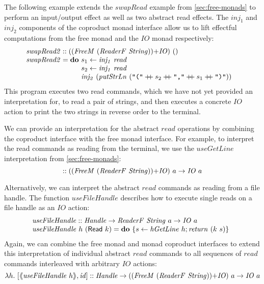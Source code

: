 \documentclass{jfp1}
\newcommand{\fmext}[1]{\langle\kern-0.25em\langle #1 \rangle\kern-0.25em\rangle}
\newcommand{\kw}[1]{\textbf{#1}}
\begin{document}
The following example extends the $\mathit{swapRead}$ example from
\autoref{sec:free-monads} to perform an input/output effect as well as
two abstract read effects.  The $\mathit{inj_1}$ and $\mathit{inj_2}$
components of the coproduct monad interface allow us to lift effectful
computations from the free monad and the $\mathit{IO}$ monad respectively:
\begin{displaymath}
  \begin{array}{@{}l}
    \mathit{swapRead2} :: (\cprd{(\mathit{FreeM}~(\mathit{ReaderF}~\mathit{String}))}{\mathit{IO}})~() \\
    \mathit{swapRead2} = \kw{do}~
    \begin{array}[t]{@{}l}
      s_1 \leftarrow \mathit{inj_1}~\mathit{read} \\
      s_2 \leftarrow \mathit{inj_1}~\mathit{read} \\
      \mathit{inj_2}~(\mathit{putStrLn}~(\texttt{"("} \dplus s_2 \dplus \texttt{","} \dplus s_1 \dplus \texttt{")"}))
    \end{array}
  \end{array}
\end{displaymath}
This program executes two read commands, which we have not yet
provided an interpretation for, to read a pair of strings, and then
executes a concrete $\mathit{IO}$ action to print the two strings in
reverse order to the terminal.

We can provide an interpretation for the abstract $\mathit{read}$
operations by combining the coproduct interface with the free monad
interface. For example, to interpret the read commands as reading from
the terminal, we use the $\mathit{useGetLine}$ interpretation from
\autoref{sec:free-monads}:
\begin{displaymath}
  [\fmext{\mathit{useGetLine}}, \mathit{id}] :: (\cprd{(\mathit{FreeM}~(\mathit{ReaderF}~\mathit{String}))}{\mathit{IO}})~a \to \mathit{IO}~a
\end{displaymath}

Alternatively, we can interpret the abstract $\mathit{read}$ commands
as reading from a file handle. The function $\mathit{useFileHandle}$
describes how to execute single reads on a file handle as an $\mathit{IO}$ action:
\begin{displaymath}
  \begin{array}{@{}l}
    \mathit{useFileHandle} :: \mathit{Handle} \to \mathit{ReaderF}~\mathit{String}~a \to \mathit{IO}~a \\
    \mathit{useFileHandle}~h~(\mathsf{Read}~k) = \kw{do}~\{ s \leftarrow \mathit{hGetLine}~h; \mathit{return}~(k~s) \}
  \end{array}
\end{displaymath}
Again, we can combine the free monad and monad coproduct interfaces to
extend this interpretation of individual abstract $\mathit{read}$
commands to all sequences of $\mathit{read}$ commands interleaved with
arbitrary $\mathit{IO}$ actions:
\begin{displaymath}
  \lambda h.~[\fmext{\mathit{useFileHandle}~h}, \mathit{id}] :: \mathit{Handle} \to (\cprd{(\mathit{FreeM}~(\mathit{ReaderF}~\mathit{String}))}{\mathit{IO}})~a \to \mathit{IO}~a
\end{displaymath}
\end{document}

